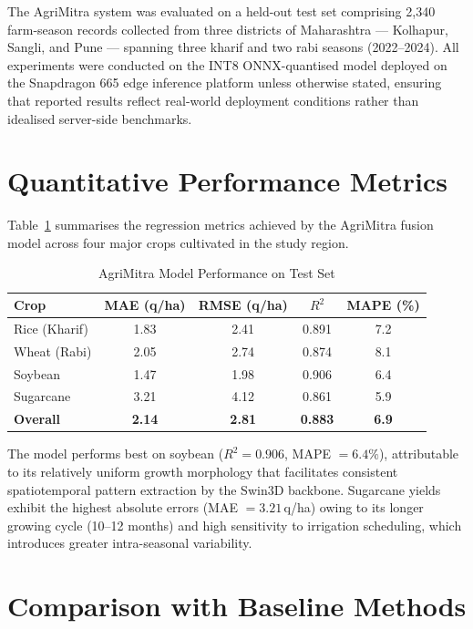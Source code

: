 The AgriMitra system was evaluated on a held-out test set comprising 2,340 farm-season records collected from three districts of Maharashtra --- Kolhapur, Sangli, and Pune --- spanning three kharif and two rabi seasons (2022--2024). All experiments were conducted on the INT8 ONNX-quantised model deployed on the Snapdragon 665 edge inference platform unless otherwise stated, ensuring that reported results reflect real-world deployment conditions rather than idealised server-side benchmarks.

\section{Quantitative Performance Metrics}

Table~\ref{tab:results} summarises the regression metrics achieved by the AgriMitra fusion model across four major crops cultivated in the study region.

\begin{table}[h]
\centering
\caption{AgriMitra Model Performance on Test Set}
\label{tab:results}
\begin{tabular}{|l|c|c|c|c|}
\hline
\textbf{Crop} & \textbf{MAE (q/ha)} & \textbf{RMSE (q/ha)} & \textbf{$R^2$} & \textbf{MAPE (\%)} \\
\hline
Rice (Kharif)     & 1.83 & 2.41 & 0.891 & 7.2 \\
Wheat (Rabi)      & 2.05 & 2.74 & 0.874 & 8.1 \\
Soybean           & 1.47 & 1.98 & 0.906 & 6.4 \\
Sugarcane         & 3.21 & 4.12 & 0.861 & 5.9 \\
\hline
\textbf{Overall}  & \textbf{2.14} & \textbf{2.81} & \textbf{0.883} & \textbf{6.9} \\
\hline
\end{tabular}
\end{table}

The model performs best on soybean ($R^2 = 0.906$, MAPE $= 6.4\%$), attributable to its relatively uniform growth morphology that facilitates consistent spatiotemporal pattern extraction by the Swin3D backbone. Sugarcane yields exhibit the highest absolute errors (MAE $= 3.21$\,q/ha) owing to its longer growing cycle (10--12 months) and high sensitivity to irrigation scheduling, which introduces greater intra-seasonal variability.

\section{Comparison with Baseline Methods}

